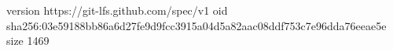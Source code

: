version https://git-lfs.github.com/spec/v1
oid sha256:03e59188bb86a6d27fe9d9fcc3915a04d5a82aac08ddf753c7e96dda76eeae5e
size 1469
